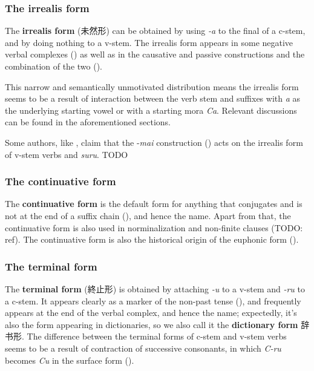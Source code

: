\documentclass[UTF8, a4paper, oneside, scheme=plain]{ctexrep}
\newcommand*{\citepage}[1]{pp.~{#1}}
\newcommand*{\concept}[1]{\textbf{#1}}
\newcommand{\corpus}[1]{\emph{#1}}
\begin{document}
\subsubsection{The irrealis form}\label{sec:irrealis-form}

The \concept{irrealis form} (未然形) can be obtained by using \corpus{-a} to the final of a c-stem,
and by doing nothing to a v-stem.
The irrealis form appears in some negative verbal complexes ()
as well as in the causative and passive constructions 
and the combination of the two (). 

This narrow and semantically unmotivated distribution means 
the irrealis form seems to be a result of  
interaction between the verb stem and 
suffixes with \corpus{a} as the underlying starting vowel or with a starting mora \corpus{Ca}.
Relevant discussions can be found in the aforementioned sections.

Some authors, like \citet[\citepage{64}]{gu2004},
claim that the -\corpus{mai} construction () 
acts on the irrealis form of v-stem verbs and \corpus{suru}. TODO

\subsubsection{The continuative form}\label{sec:continuative-form}

The \concept{continuative form} is the default form for anything that conjugates
and is not at the end of a suffix chain (),
and hence the name.
Apart from that, the continuative form is also used in norminalization and non-finite clauses (TODO: ref).
The continuative form is also the historical origin of the euphonic form ().

\subsubsection{The terminal form}\label{sec:terminal-form}

The \concept{terminal form} (終止形) is obtained by attaching \corpus{-u} to a v-stem and \corpus{-ru} to a c-stem.
It appears clearly as a marker of the non-past tense (),
and frequently appears at the end of the verbal complex, and hence the name;
expectedly, it's also the form appearing in dictionaries,
so we also call it the \concept{dictionary form} 辞书形.
The difference between the terminal forms of c-stem and v-stem verbs 
seems to be a result of contraction of successive consonants,
in which \corpus{C-ru} becomes \corpus{Cu} in the surface form
().
\end{document}
